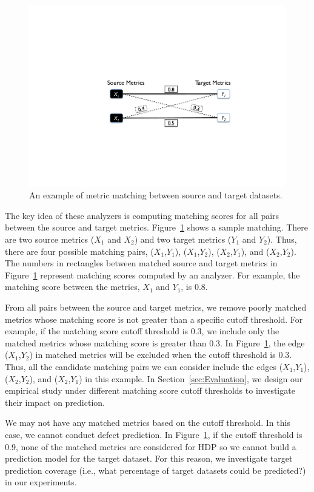 \begin{figure}[t]
	\centering
	\includegraphics[width=\linewidth]{Figures/matching.pdf}
	\caption{An example of metric matching between source and target
	datasets.}
	\label{fig:matching}
\end{figure}

The key idea of these analyzers is computing matching
scores for all pairs between the source and target metrics.
Figure~\ref{fig:matching} shows a sample
matching. There are two source metrics ($X_1$ and $X_2$) and
two target metrics ($Y_1$ and $Y_2$). Thus, there are four possible matching
pairs, ($X_1$,$Y_1$), ($X_1$,$Y_2$), ($X_2$,$Y_1$), and ($X_2$,$Y_2$). The
numbers in rectangles between matched source and target metrics in
Figure~\ref{fig:matching} represent matching scores computed by an analyzer. For example,
the matching score between the metrics, $X_1$ and $Y_1$, is 0.8.

From all pairs between the source and target metrics, we remove poorly matched
metrics whose matching score is not greater than a specific cutoff threshold.
For example, if the matching score cutoff threshold is 0.3, we include only the
matched metrics whose matching score is greater than 0.3. In
Figure~\ref{fig:matching}, the edge ($X_1$,$Y_2$) in matched metrics will be
excluded when the cutoff threshold is 0.3. Thus, all the candidate matching
pairs we can consider include the edges ($X_1$,$Y_1$), ($X_2$,$Y_2$), and
($X_2$,$Y_1$) in this example.
In Section~\ref{sec:Evaluation}, we design our empirical study under different
matching score cutoff thresholds to investigate their impact on prediction.

We may not have any matched metrics based on the cutoff threshold. In this
case, we cannot conduct defect prediction. In
Figure~\ref{fig:matching}, if the cutoff threshold is 0.9, none of the matched
metrics are considered for HDP so we cannot build a prediction model for the target
dataset. For this reason, we investigate target prediction coverage (i.e.,
what percentage of target datasets could be predicted?) in
our experiments.

